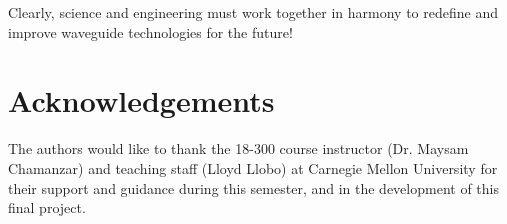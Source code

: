 \documentclass[10pt]{article}
\begin{document}
Clearly, science and engineering must work together in harmony to redefine and improve waveguide technologies for the future!







\section{Acknowledgements}


The authors would like to thank the 18-300 course instructor (Dr. Maysam Chamanzar)
and teaching staff (Lloyd Llobo) at Carnegie Mellon University for their support and
guidance during this semester, and in the development of this final project.



\end{document}
